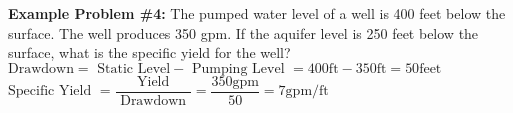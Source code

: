 \vspace{0.3cm}
\textbf{Example Problem \#4:} The pumped water level of a well is 400 feet below the surface. The well produces 350 gpm. If the aquifer level is 250 feet below the surface, what is the specific yield for the well?\\
  $\text {Drawdown} =\text { Static Level}-\text { Pumping Level } =400 \mathrm{ft}-350 \mathrm{ft}=50 \mathrm{feet}$\\
  \vspace{0.2cm}
  $\text {Specific Yield }=\dfrac{\text { Yield }}{\text { Drawdown }}=\dfrac{350 \mathrm{gpm}}{\text { 50 }}=7 \mathrm{gpm} / \mathrm{ft}$ \\













